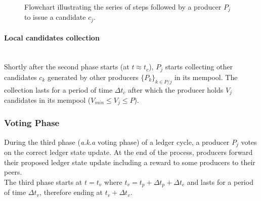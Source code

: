 \begin{enumerate}
\begin{figure}[H]
\label{fig:computation}
\caption{\label{fig:computation} Flowchart illustrating the series of steps followed by a producer $P_j$ to issue a candidate $c_j$.}
\end{figure}
\end{enumerate}

\paragraph{Local candidates collection}\mbox{}\\
Shortly after the second phase starts (at $t \approx t_c$), $P_j$ starts collecting other candidates $c_{k}$ generated by other producers $\{P_k\}_{k \in P/j}$ in its mempool. The collection lasts for a period of time $\Delta t_{c}$ after which the producer holds $V_j$ candidates in its mempool ($V_{min} \leq V_j \leq P$). 

\subsubsection{Voting Phase}

During the third phase (\textit{a.k.a} voting phase) of a ledger cycle, a producer $P_j$ votes on the correct ledger state update. At the end of the process, producers forward their proposed ledger state update including a reward to some producers to their peers. \\

The third phase starts at $t = t_v$ where $t_v = t_p + \Delta t_{p} + \Delta t_{c}$ and lasts for a period of time $\Delta t_{v}$, therefore ending at $t_v+\Delta t_{v}$.


